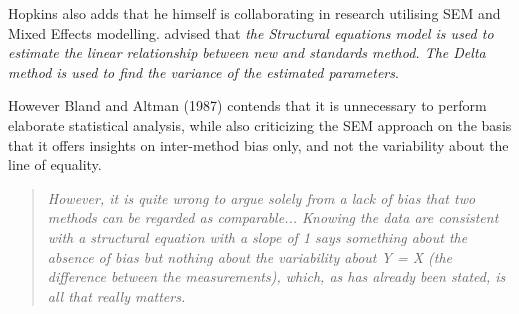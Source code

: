 \documentclass[12pt, a4paper]{report}
\theoremstyle{plain}
\theoremstyle{definition}
\theoremstyle{remark}
\begin{document}
Hopkins also adds that he himself is collaborating in research utilising SEM and Mixed Effects modelling. \citet{gkelly1985} advised that \textit{the Structural equations model is used to estimate the linear relationship between new and standards method.
The Delta method is used to find the variance of the estimated parameters}\citep{gkelly1985}.


However Bland and Altman (1987) contends that it is unnecessary to perform elaborate statistical analysis, while also criticizing the SEM approach on the basis that it offers insights  on inter-method bias only, and not the variability about the line of equality. 
\begin{quote}
\textit{	However, it is quite wrong to argue solely from a lack of bias that two methods can be regarded as comparable...
Knowing the data are consistent with a structural equation with a slope of 1 says something 
about the absence of bias but nothing about the variability about Y = X (the difference between the measurements), which, as has already been stated, is all that really matters.}
\end{quote}




\end{document}
